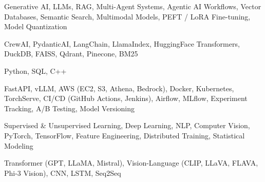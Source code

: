 \documentclass[letter,10pt]{article}
\begin{document}
 Generative AI, LLMs, RAG, Multi-Agent Systems, Agentic AI Workflows, Vector Databases, Semantic Search, Multimodal Models, PEFT / LoRA Fine-tuning, Model Quantization\par\vspace{2pt}

 CrewAI, PydanticAI, LangChain, LlamaIndex, HuggingFace Transformers, DuckDB, FAISS, Qdrant, Pinecone, BM25\par\vspace{2pt}

 Python, SQL, C++\par\vspace{2pt}

 FastAPI, vLLM, AWS (EC2, S3, Athena, Bedrock), Docker, Kubernetes, TorchServe, CI/CD (GitHub Actions, Jenkins), Airflow, MLflow, Experiment Tracking, A/B Testing, Model Versioning\par\vspace{2pt}

 Supervised \& Unsupervised Learning, Deep Learning, NLP, Computer Vision, PyTorch, TensorFlow, Feature Engineering, Distributed Training, Statistical Modeling\par\vspace{2pt}

 Transformer (GPT, LLaMA, Mistral), Vision-Language (CLIP, LLaVA, FLAVA, Phi-3 Vision), CNN, LSTM, Seq2Seq
\end{document}
